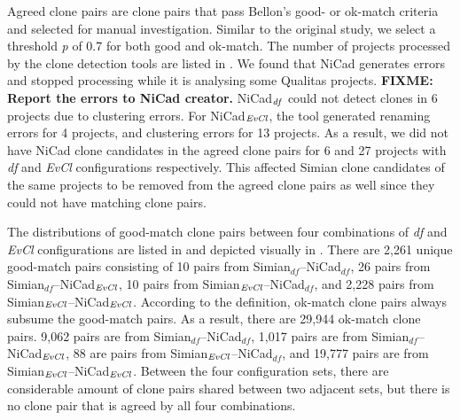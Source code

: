 \documentclass{sig-alternate-05-2015}
\newcommand\FIXME[1]{\textbf{FIXME: #1}}
\begin{document}
Agreed clone pairs are clone pairs that pass Bellon's good- or ok-match criteria and selected for manual investigation.  Similar to the original study, we select a threshold \textit{p} of 0.7 for both good and ok-match\cite{Bellon2007}. The number of projects processed by the clone detection tools are listed in . We found that NiCad generates errors and stopped processing while it is analysing some Qualitas projects. \FIXME{Report the errors to NiCad creator.}  NiCad$_{\textrm{\textit{df}}}$ could not detect clones in 6 projects due to clustering errors. For NiCad$_{\textrm{\textit{EvCl}}}$, the tool generated renaming errors for 4 projects, and clustering errors for 13 projects. As a result, we did not have NiCad clone candidates in the agreed clone pairs for 6 and 27 projects with \textit{df} and \textit{EvCl} configurations respectively. This affected Simian clone candidates of the same projects to be removed from the agreed clone pairs as well since they could not have matching clone pairs. 

The distributions of good-match clone pairs between four combinations of \textit{df} and \textit{EvCl} configurations are listed in  and depicted visually in . There are 2,261 unique good-match pairs consisting of 10 pairs from Simian$_{df}$--NiCad$_{df}$, 26 pairs from Simian$_{df}$--NiCad$_{\textrm{\textit{EvCl}}}$, 10 pairs from Simian$_{\textrm{\textit{EvCl}}}$--NiCad$_{df}$, and 2,228 pairs from Simian$_{\textrm{\textit{EvCl}}}$--NiCad$_{\textrm{\textit{EvCl}}}$. According to the definition, ok-match clone pairs always subsume the good-match pairs. As a result, there are 29,944 ok-match clone pairs. 9,062 pairs are from Simian$_{df}$--NiCad$_{df}$, 1,017 pairs are from Simian$_{df}$--NiCad$_{\textrm{\textit{EvCl}}}$, 88 are pairs from Simian$_{\textrm{\textit{EvCl}}}$--NiCad$_{df}$, and 19,777 pairs are from Simian$_{\textrm{\textit{EvCl}}}$--NiCad$_{\textrm{\textit{EvCl}}}$. Between the four configuration sets, there are considerable amount of clone pairs shared between two adjacent sets, but there is no clone pair that is agreed by all four combinations.

\end{document}
